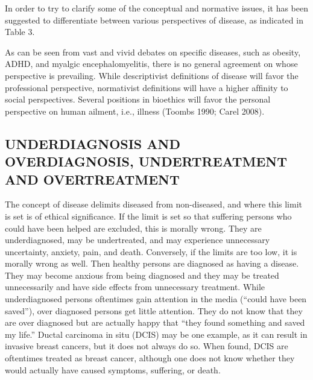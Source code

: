 \documentclass[conference]{IEEEtran}
\begin{document}
In order to try to clarify some of the conceptual and normative issues, it has been suggested to differentiate between various perspectives of disease, as indicated in Table 3.

As can be seen from vast and vivid debates on speciﬁc diseases, such as obesity, ADHD, and myalgic encephalomyelitis, there is no general agreement on whose perspective is prevailing. While descriptivist deﬁnitions of disease will favor the professional perspective, normativist deﬁnitions will have a higher afﬁnity to social perspectives. Several positions in bioethics will favor the personal perspective on human ailment, i.e., illness (Toombs 1990; Carel 2008).



\subsection{UNDERDIAGNOSIS AND OVERDIAGNOSIS, UNDERTREATMENT AND OVERTREATMENT}
The concept of disease delimits diseased from non-diseased, and where this limit is set is of ethical signiﬁcance. If the limit is set so that suffering persons who could have been helped are excluded, this is morally wrong. They are underdiagnosed, may be undertreated, and may experience unnecessary uncertainty, anxiety, pain, and death. Conversely, if the limits are too low, it is morally wrong as well. Then healthy persons are diagnosed as having a disease. They may become anxious from being diagnosed and they may be treated unnecessarily and have side effects from unnecessary treatment. While underdiagnosed persons oftentimes gain attention in the media \cite{b5}(“could have been saved”), over diagnosed persons get little attention. They do not know that they are over diagnosed but are actually happy that “they found something and saved my life.” Ductal carcinoma in situ (DCIS) may be one example, as it can result in invasive breast cancers, but it does not always do so. When found, DCIS are oftentimes treated as breast cancer, although one does not know whether they would actually have caused symptoms, suffering, or death.
\end{document}
